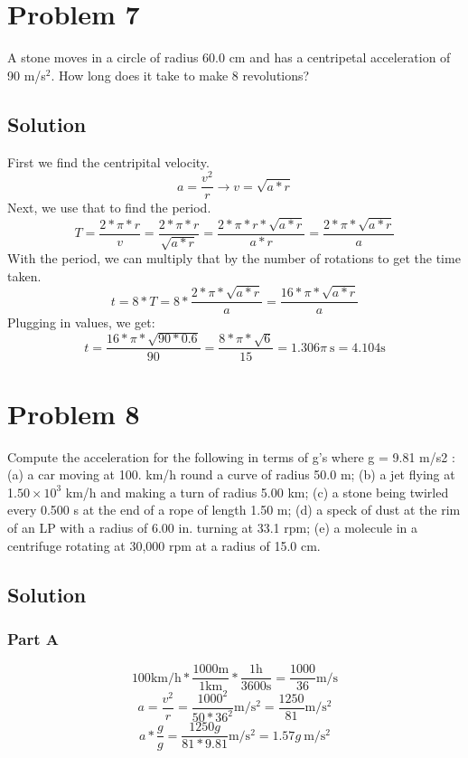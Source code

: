 \documentclass[12pt]{article}
\begin{document}
\pagebreak
\section*{Problem 7}
A stone moves in a circle of radius 60.0 cm and has a centripetal acceleration of 90 m/s$^2$. How
long does it take to make 8 revolutions?

\subsection*{Solution}
First we find the centripital velocity.
\[ a = \frac{v^2}{r} \rightarrow v = \sqrt{a*r} \]
Next, we use that to find the period.
\[ T = \frac{2*\pi*r}{v} = \frac{2*\pi*r}{\sqrt{a*r}} = \frac{2*\pi*r*\sqrt{a*r}}{a*r} = \frac{2*\pi*\sqrt{a*r}}{a} \]
With the period, we can multiply that by the number of rotations to get the time taken.
\[ t = 8*T = 8*\frac{2*\pi*\sqrt{a*r}}{a} = \frac{16*\pi*\sqrt{a*r}}{a} \]
Plugging in values, we get:
\[ t = \frac{16*\pi*\sqrt{90*0.6}}{90} = \frac{8*\pi*\sqrt{6}}{15} = \boxed{1.306\pi\ \unit{\second} = 4.104 \unit{\second}} \]

\pagebreak
\section*{Problem 8}
Compute the acceleration for the following in terms of g's where g = 9.81 m/s2 : (a) a car
moving at 100. km/h round a curve of radius 50.0 m; (b) a jet flying at 1.$50\times10^3$ km/h and
making a turn of radius 5.00 km; (c) a stone being twirled every 0.500 s at the end of a rope of
length 1.50 m; (d) a speck of dust at the rim of an LP with a radius of 6.00 in. turning at 33.1
rpm; (e) a molecule in a centrifuge rotating at 30,000 rpm at a radius of 15.0 cm.

\subsection*{Solution}
\subsubsection*{Part A}
\[ 100 \unit{\kilo\meter/\hour} * \frac{1000\unit{\meter}}{1\unit{\kilo\meter}} * \frac{1\unit{\hour}}{3600\unit{\second}} = \frac{1000}{36}\unit{\meter/\second} \]
\[ a = \frac{v^2}{r} = \frac{1000^2}{50*36^2} \unit{\meter/\second^2} = \frac{1250}{81} \unit{\meter/\second^2} \]
\[ a*\frac{g}{g} = \frac{1250g}{81*9.81} \unit{\meter/\second^2} = \boxed{1.57g\ \unit{\meter/\second^2}}\]
\end{document}

